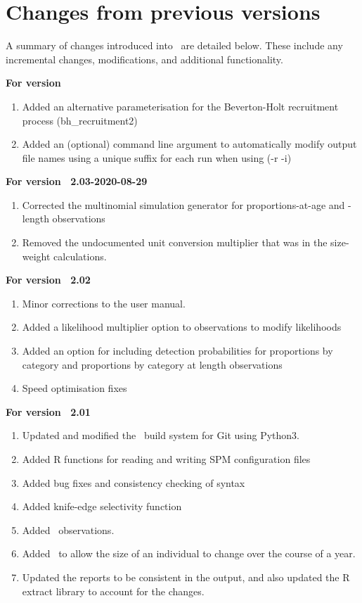 \section{Changes from previous versions}

A summary of changes introduced into \SPM\ are detailed below. These include any incremental changes, modifications, and additional functionality.

\textbf{For version \SPM\ \VER}
\begin{enumerate}
  \item Added an alternative parameterisation for the Beverton-Holt recruitment process (bh\_recruitment2)
  \item Added an (optional) command line argument to automatically modify output file names using a unique suffix for each run when using (-r -i)
\end{enumerate}

\textbf{For version \SPM\ 2.03-2020-08-29}
\begin{enumerate}
  \item Corrected the multinomial simulation generator for proportions-at-age and -length observations
	\item Removed the undocumented unit conversion multiplier that was in the size-weight calculations.
\end{enumerate}

\textbf{For version \SPM\ 2.02}

\begin{enumerate}
  \item Minor corrections to the user manual.
	\item Added a likelihood multiplier option to observations to modify likelihoods
	\item Added an option for including detection probabilities for proportions by category and proportions by category at length observations
	\item Speed optimisation fixes
\end{enumerate}

\textbf{For version \SPM\ 2.01}

\begin{enumerate}
  \item Updated and modified the \SPM\ build system for Git using Python3.
  \item Added R functions for reading and writing SPM configuration files
	\item Added bug fixes and consistency checking of syntax
	\item Added knife-edge selectivity function
  \item Added\  observations.
  \item Added\  to allow the size of an individual to change over the course of a year.	
  \item Updated the reports to be consistent in the output, and also updated the R extract library to account for the changes.
\end{enumerate}


